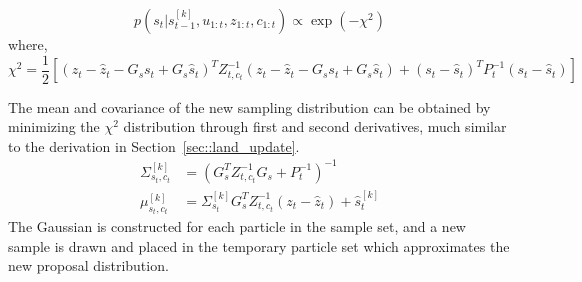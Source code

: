 \begin{equation}
p(s_t|s^{[k]}_{t-1},u_{1:t},z_{1:t},c_{1:t}) \propto \exp\left(-\chi^2\right)
\end{equation} 
where,
\begin{equation}
\chi^2 = \frac{1}{2}\left[\left(z_t-\hat{z}_t-G_ss_t+G_s\hat{s}_t\right)^TZ_{t,c_t}^{-1}\left(z_t-\hat{z}_t-G_ss_t+G_s\hat{s}_t\right)+\left(s_t-\hat{s}_t\right)^TP^{-1}_t\left(s_t-\hat{s}_t\right)\right]
\end{equation}

The mean and covariance of the new sampling distribution can be obtained by minimizing the $\chi^2$ distribution through first and second derivatives, much similar to the derivation in Section~\ref{sec::land_update}.
\begin{align}
\Sigma^{[k]}_{s_t,c_t} &= \left(G^T_sZ^{-1}_{t,c_t}G_s+P^{-1}_t\right)^{-1} \label{mod_mean}\\
\mu^{[k]}_{s_t,c_t} &= \Sigma^{[k]}_{s_t}G^T_sZ^{-1}_{t,c_t}\left(z_t-\hat{z}_t\right)+\hat{s}^{[k]}_t \label{mod_cov}
\end{align}
The Gaussian is constructed for each particle in the sample set, and a new sample is drawn and placed in the temporary particle set which approximates the new proposal distribution. 

